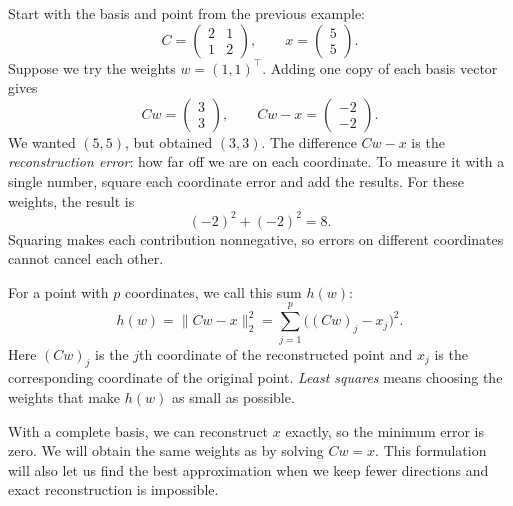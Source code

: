 \documentclass[a4paper,12pt,oneside]{report}
\begin{document}
Start with the basis and point from the previous example:
\[
  C=\begin{pmatrix}2&1\\1&2\end{pmatrix},\qquad
  x=\begin{pmatrix}5\\5\end{pmatrix}.
\]
Suppose we try the weights $w=(1,1)^\top$. Adding one copy of each
basis vector gives
\[
  Cw=\begin{pmatrix}3\\3\end{pmatrix},\qquad
  Cw-x=\begin{pmatrix}-2\\-2\end{pmatrix}.
\]
We wanted $(5,5)$, but obtained $(3,3)$. The difference $Cw-x$ is the
\emph{reconstruction error}: how far off we are on each coordinate.
To measure it with a single number, square each coordinate error and
add the results. For these weights, the result is
\[
  (-2)^2+(-2)^2=8.
\]
Squaring makes each contribution nonnegative, so errors on different
coordinates cannot cancel each other.

For a point with $p$ coordinates, we call this sum $h(w)$:
\[
  h(w)=\lVert Cw-x\rVert_2^2
      =\sum_{j=1}^{p}\bigl((Cw)_j-x_j\bigr)^2.
\]
Here $(Cw)_j$ is the $j$th coordinate of the reconstructed point and
$x_j$ is the corresponding coordinate of the original point.
\emph{Least squares} means choosing the weights that make $h(w)$ as
small as possible.

With a complete basis, we can reconstruct $x$ exactly, so the minimum
error is zero. We will obtain the same weights as by solving $Cw=x$.
This formulation will also let us find the best approximation when
we keep fewer directions and exact reconstruction is impossible.
\end{document}
